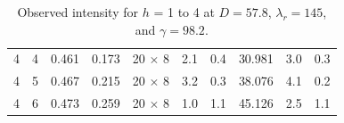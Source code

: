\begin{table}[htbp]
\begin{tabular}{rrrrcrrrrr}
  4        & 4        & 0.461    & 0.173    & 20 $\times$ 8 & 2.1      & 0.4      & 30.981    & 3.0      & 0.3 \\
  4        & 5        & 0.467    & 0.215    & 20 $\times$ 8 & 3.2      & 0.3      & 38.076    & 4.1      & 0.2 \\
  4        & 6        & 0.473    & 0.259    & 20 $\times$ 8 & 1.0      & 1.1      & 45.126    & 2.5      & 1.1 \\
    \hline
  \end{tabular}
  \caption[Observed intensity for $h$ = 1 to 4 at $D=57.8$, $\lambda_r=145$, and 
  $\gamma=98.2$\textdegree]
  {Observed intensity for $h$ = 1 to 4 at $D=57.8$, $\lambda_r=145$, and 
  $\gamma=98.2$\textdegree.}
  \label{tab:obs_intensity1}
\end{table}  

